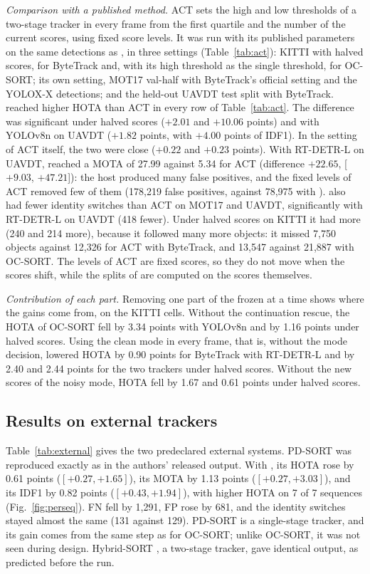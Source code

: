 \emph{Comparison with a published method.} ACT \cite{act2026adaptive} sets the
high and low thresholds of a two-stage tracker in every frame from the first
quartile and the number of the current scores, using fixed score levels. It
was run with its published parameters on the same detections as \scl{}, in
three settings (Table~\ref{tab:act}): KITTI with halved scores, for ByteTrack
and, with its high threshold as the single threshold, for OC-SORT; its own
setting, MOT17 val-half with ByteTrack's official setting and the YOLOX-X
detections; and the held-out UAVDT test split with ByteTrack. \scl{} reached
higher HOTA than ACT in every row of Table~\ref{tab:act}. The difference was
significant under halved scores ($+2.01$ and $+10.06$ points) and with
YOLOv8n on UAVDT ($+1.82$ points, with $+4.00$ points of IDF1). In the setting
of ACT itself, the two were close ($+0.22$ and $+0.23$ points). With RT-DETR-L
on UAVDT, \scl{} reached a MOTA of 27.99 against 5.34 for ACT (difference
$+22.65$, [$+9.03$, $+47.21$]): the host produced many false positives, and
the fixed levels of ACT removed few of them (178,219 false positives, against
78,975 with \scl{}). \scl{} also had fewer identity switches than ACT on MOT17 and UAVDT,
significantly with RT-DETR-L on UAVDT (418 fewer). Under halved scores on
KITTI it had more (240 and 214 more), because it followed many more objects:
it missed 7,750 objects against 12,326 for ACT with ByteTrack, and 13,547
against 21,887 with OC-SORT. The levels of ACT are fixed scores, so they do
not move when the scores shift, while the splits of \scl{} are computed on
the scores themselves.

\emph{Contribution of each part.} Removing one part of the frozen \scl{} at
a time shows where the gains come from, on the KITTI cells. Without the
continuation rescue, the HOTA of OC-SORT fell by 3.34 points with YOLOv8n and
by 1.16 points under halved scores. Using the clean mode in every frame,
that is, without the mode decision, lowered HOTA by 0.90 points
for ByteTrack with RT-DETR-L and by 2.40 and 2.44 points for the two trackers
under halved scores. Without the new scores of the noisy mode, HOTA fell by
1.67 and 0.61 points under halved scores.




\subsection{Results on external trackers}\label{sec:external}
Table~\ref{tab:external} gives the two predeclared external systems. PD-SORT
\cite{wang2025pdsort} was reproduced exactly as in the authors' released
output. With \scl{}, its HOTA rose by 0.61 points ($[+0.27,+1.65]$), its
MOTA by 1.13 points ($[+0.27,+3.03]$), and its IDF1 by 0.82 points
($[+0.43,+1.94]$), with higher HOTA on 7 of 7 sequences
(Fig.~\ref{fig:perseq}). FN fell by 1,291, FP rose by 681, and the identity switches stayed almost the
same (131 against 129). PD-SORT is a single-stage tracker, and its gain comes from the same
step as for OC-SORT; unlike OC-SORT, it was not seen during design.
Hybrid-SORT \cite{yang2024hybridsort}, a two-stage tracker, gave identical
output, as predicted before the run.

